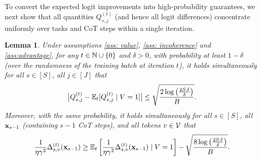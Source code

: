 \documentclass{article}
\theoremstyle{plain}
\newtheorem{lemma}[theorem]{Lemma}
\theoremstyle{definition}
\theoremstyle{remark}
\begin{document}
To convert the expected logit improvements into high-probability guarantees,
we next show that all quantities $Q^{(t)}_{s,j}$ (and hence all logit differences)
concentrate uniformly over tasks and CoT steps within a single iteration.
\begin{lemma}\label{lem:diff_hoeffding}
    Under assumptions \ref{ass: value}, \ref{ass: incoherence} and \cref{ass:advantage}, for any $t\in\mathbb{N} \cup \{0\}$ and $\delta>0$, with probability at least $1-\delta$ (over the randomness of the training batch at iteration $t$), it holds simultaneously for all $s\in[S]$, all $j\in[J]$ that
    \begin{align}\label{eq:Q_hoeffding_uniform}
        \big|Q^{(t)}_{s,j} - \mathbb{E}_t[Q^{(t)}_{s,j}\mid V=1]\big|
        \leq \sqrt{\frac{2\log\left(\frac{2SJ}{\delta}\right)}{B}}.
    \end{align}
    Moreover, with the same probability, it holds simultaneously for all $s\in[S]$, all $\mathbf{x}_{s-1}$ (containing $s-1$ CoT steps), and all tokens $v\in\mathcal{V}$ that
    \begin{align}\label{eq:Delta_hoeffding_uniform}
        \frac{1}{\eta \gamma^2}\Delta^{(t)}_{s,v}(\mathbf{x}_{s-1})
        \ge
        \mathbb{E}_t\left[\frac{1}{\eta \gamma^2}\Delta^{(t)}_{s,v}(\mathbf{x}_{s-1})\mid V=1\right]
        - \sqrt{\frac{8\log\left(\frac{2SJ}{\delta}\right)}{B}}.
    \end{align}
\end{lemma}
\end{document}
